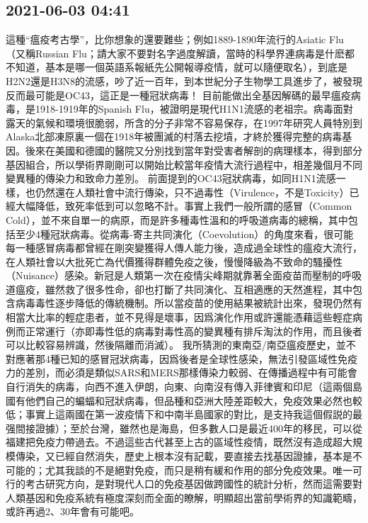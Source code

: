 \documentclass[twocolumn]{ctexart}
\begin{document}
\subsection*{2021-06-03 04:41}

這種“瘟疫考古學”，比你想象的還要難些；例如1889-1890年流行的Asiatic Flu（又稱Russian Flu；請大家不要對名字過度解讀，當時的科學界連病毒是什麽都不知道，基本是哪一個英語系報紙先公開報導疫情，就可以隨便取名），到底是H2N2還是H3N8的流感，吵了近一百年，到本世紀分子生物學工具進步了，被發現反而最可能是OC43，這正是一種冠狀病毒！
目前能做出全基因解碼的最早瘟疫病毒，是1918-1919年的Spanish Flu，被證明是現代H1N1流感的老祖宗。病毒面對露天的氣候和環境很脆弱，所含的分子非常不容易保存，在1997年研究人員特別到Alaska北部凍原裏一個在1918年被團滅的村落去挖墳，才終於獲得完整的病毒基因。後來在美國和德國的醫院又分別找到當年對受害者解剖的病理樣本，得到部分基因組合，所以學術界剛剛可以開始比較當年疫情大流行過程中，相差幾個月不同變異種的傳染力和致命力差別。
前面提到的OC43冠狀病毒，如同H1N1流感一樣，也仍然還在人類社會中流行傳染，只不過毒性（Virulence，不是Toxicity）已經大幅降低，致死率低到可以忽略不計。事實上我們一般所謂的感冒（Common Cold），並不來自單一的病原，而是許多種毒性溫和的呼吸道病毒的總稱，其中包括至少4種冠狀病毒。從病毒-寄主共同演化（Coevolution）的角度來看，很可能每一種感冒病毒都曾經在剛突變獲得人傳人能力後，造成過全球性的瘟疫大流行，在人類社會以大批死亡為代價獲得群體免疫之後，慢慢降級為不致命的騷擾性（Nuisance）感染。新冠是人類第一次在疫情尖峰期就靠著全面疫苗而壓制的呼吸道瘟疫，雖然救了很多性命，卻也打斷了共同演化、互相適應的天然進程，其中包含病毒毒性逐步降低的傳統機制。所以當疫苗的使用結果被統計出來，發現仍然有相當大比率的輕症患者，並不見得是壞事，因爲演化作用或許還能憑藉這些輕症病例而正常運行（亦即毒性低的病毒對毒性高的變異種有排斥淘汰的作用，而且後者可以比較容易辨識，然後隔離而消滅）。
我所猜測的東南亞/南亞瘟疫歷史，並不對應著那4種已知的感冒冠狀病毒，因爲後者是全球性感染，無法引發區域性免疫力的差別，而必須是類似SARS和MERS那樣傳染力較弱、在傳播過程中有可能會自行消失的病毒，向西不進入伊朗，向東、向南沒有傳入菲律賓和印尼（這兩個島國有他們自己的蝙蝠和冠狀病毒，但品種和亞洲大陸差距較大，免疫效果必然也較低；事實上這兩國在第一波疫情下和中南半島國家的對比，是支持我這個假説的最强間接證據）；至於台灣，雖然也是海島，但多數人口是最近400年的移民，可以從福建把免疫力帶過去。不過這些古代甚至上古的區域性疫情，既然沒有造成超大規模傳染，又已經自然消失，歷史上根本沒有記載，要直接去找基因證據，基本是不可能的；尤其我談的不是絕對免疫，而只是稍有緩和作用的部分免疫效果。唯一可行的考古研究方向，是對現代人口的免疫基因做跨國性的統計分析，然而這需要對人類基因和免疫系統有極度深刻而全面的瞭解，明顯超出當前學術界的知識範疇，或許再過2、30年會有可能吧。
\end{document}
